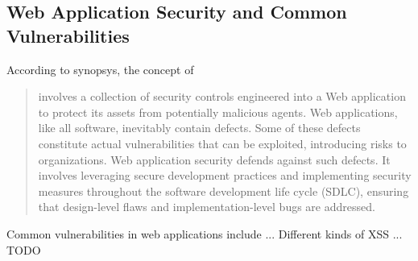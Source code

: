 \subsection{Web Application Security and Common Vulnerabilities}
According to synopsys, the concept of  
\begin{quote}
involves a collection of security controls engineered into a Web application to protect its assets from potentially malicious agents. Web applications, like all software, inevitably contain defects. Some of these defects constitute actual vulnerabilities that can be exploited, introducing risks to organizations. Web application security defends against such defects. It involves leveraging secure development practices and implementing security measures throughout the software development life cycle (SDLC), ensuring that design-level flaws and implementation-level bugs are addressed.
\end{quote}
Common vulnerabilities in web applications include ... \cite{OWASP/Top10}
Different kinds of XSS ...
{\color{red}TODO}
